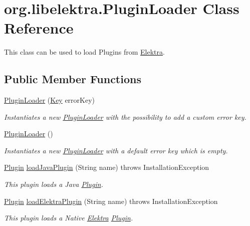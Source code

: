 \hypertarget{classorg_1_1libelektra_1_1PluginLoader}{}\section{org.\+libelektra.\+Plugin\+Loader Class Reference}
\label{classorg_1_1libelektra_1_1PluginLoader}


This class can be used to load Plugins from \hyperlink{interfaceorg_1_1libelektra_1_1Elektra}{Elektra}.  


\subsection*{Public Member Functions}
\begin{DoxyCompactItemize}
\item 
\hyperlink{classorg_1_1libelektra_1_1PluginLoader_a4b09bcfc261043549a8f77d193fcf28a}{Plugin\+Loader} (\hyperlink{classorg_1_1libelektra_1_1Key}{Key} error\+Key)
\begin{DoxyCompactList}\small\item\em Instantiates a new \hyperlink{classorg_1_1libelektra_1_1PluginLoader}{Plugin\+Loader} with the possibility to add a custom error key. \end{DoxyCompactList}\item 
\mbox{\label{classorg_1_1libelektra_1_1PluginLoader_aa0e69f9062f84be90509111b7f0824db}} 
\hyperlink{classorg_1_1libelektra_1_1PluginLoader_aa0e69f9062f84be90509111b7f0824db}{Plugin\+Loader} ()
\begin{DoxyCompactList}\small\item\em Instantiates a new \hyperlink{classorg_1_1libelektra_1_1PluginLoader}{Plugin\+Loader} with a default error key which is empty. \end{DoxyCompactList}\item 
\hyperlink{interfaceorg_1_1libelektra_1_1Plugin}{Plugin} \hyperlink{classorg_1_1libelektra_1_1PluginLoader_af0eac085b1b966aaabfda24ad0836f43}{load\+Java\+Plugin} (String name)  throws Installation\+Exception 	
\begin{DoxyCompactList}\small\item\em This plugin loads a Java \hyperlink{interfaceorg_1_1libelektra_1_1Plugin}{Plugin}. \end{DoxyCompactList}\item 
\hyperlink{interfaceorg_1_1libelektra_1_1Plugin}{Plugin} \hyperlink{classorg_1_1libelektra_1_1PluginLoader_a0bf523c047b71f45a4f0cad2b3c7fb60}{load\+Elektra\+Plugin} (String name)  throws Installation\+Exception 	
\begin{DoxyCompactList}\small\item\em This plugin loads a Native \hyperlink{interfaceorg_1_1libelektra_1_1Elektra}{Elektra} \hyperlink{interfaceorg_1_1libelektra_1_1Plugin}{Plugin}. \end{DoxyCompactList}\end{DoxyCompactItemize}


